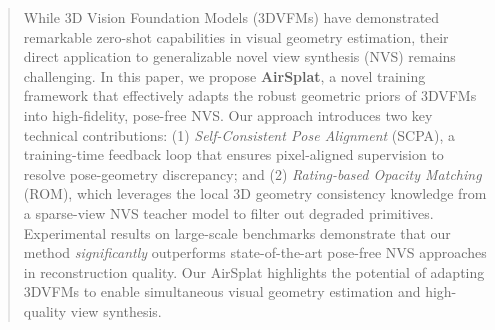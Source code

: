 \begin{abstract}
  While 3D Vision Foundation Models (3DVFMs) have demonstrated remarkable zero-shot capabilities in visual geometry estimation, their direct application to generalizable novel view synthesis (NVS) remains challenging.
  In this paper, we propose \textbf{AirSplat}, a novel training framework that effectively adapts the robust geometric priors of 3DVFMs into high-fidelity, pose-free NVS. Our approach introduces two key technical contributions: 
  (1) \textit{Self-Consistent Pose Alignment} (SCPA), a training-time feedback loop that ensures pixel-aligned supervision to resolve pose-geometry discrepancy; and 
  (2) \textit{Rating-based Opacity Matching} (ROM), which leverages the local 3D geometry consistency knowledge from a sparse-view NVS teacher model to filter out degraded primitives.
  Experimental results on large-scale benchmarks demonstrate that our method \textit{significantly} outperforms state-of-the-art pose-free NVS approaches in reconstruction quality.
  Our AirSplat highlights the potential of adapting 3DVFMs to enable simultaneous visual geometry estimation and high-quality view synthesis.
\end{abstract}